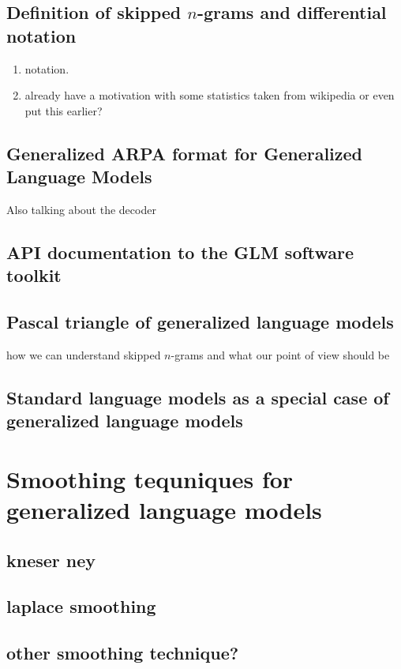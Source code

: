\section{Definition of skipped $n$-grams and differential notation}
\begin{enumerate}
\item notation. 
\item already have a motivation with some statistics taken from wikipedia or even put this earlier?
\end{enumerate}


\section{Generalized ARPA format for Generalized Language Models}
Also talking about the decoder
\section{API documentation to the GLM software toolkit}

\section{Pascal triangle of generalized language models}
how we can understand skipped $n$-grams and what our point of view should be

\section{Standard language models as a special case of generalized language models}



\chapter{Smoothing tequniques for generalized language models}
 
\section{kneser ney}
\section{laplace smoothing}
\section{other smoothing technique?}


